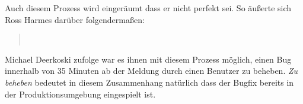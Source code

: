 Auch diesem Prozess wird eingeräumt dass er nicht perfekt sei. So äußerte sich
Ross Harmes darüber folgendermaßen:

\begin{quote}
~\cite{flickr09}
\end{quote}

Michael Deerkoski zufolge \cite{flickr11} war es ihnen mit diesem Prozess
möglich, einen Bug innerhalb von 35 Minuten ab der Meldung durch einen
Benutzer zu beheben. \emph{Zu beheben} bedeutet in diesem Zusammenhang
natürlich dass der Bugfix bereits in der Produktionsumgebung eingespielt ist.


